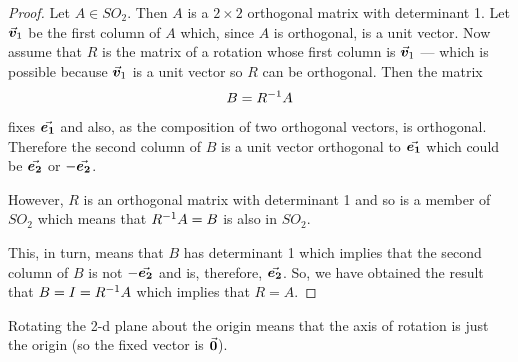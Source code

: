 \documentclass[MathsNotesBase.tex]{subfiles}
\begin{document}
{	\medskip
	
	\begin{proof}
		Let ${ A \in SO_2 }$. Then $A$ is a ${ 2 \times 2 }$ orthogonal matrix with determinant 1. Let $\vec{\bm{v}}_1$ be the first column of $A$ which, since $A$ is orthogonal, is a unit vector. Now assume that $R$ is the matrix of a rotation whose first column is $\vec{\bm{v}}_1$ --- which is possible because $\vec{\bm{v}}_1$ is a unit vector so $R$ can be orthogonal. Then the matrix
		\[ B = {R}^{-1}A \]
		fixes $\vec{\bm{e_1}}$ and also, as the composition of two orthogonal vectors, is orthogonal. Therefore the second column of $B$ is a unit vector orthogonal to $\vec{\bm{e_1}}$ which could be $\vec{\bm{e_2}}$ or $-\vec{\bm{e_2}}$. 
		
		However, $R$ is an orthogonal matrix with determinant 1 and so is a member of $SO_2$ which means that ${ {R}^{-1}A = B }$ is also in $SO_2$. 
		
		This, in turn, means that $B$ has determinant 1 which implies that the second column of $B$ is not $-\vec{\bm{e_2}}$ and is, therefore, $\vec{\bm{e_2}}$. So, we have obtained the result that ${ B = I = {R}^{-1}A }$ which implies that ${ R = A }$.
	\end{proof}

	\bigskip
	Rotating the 2-d plane about the origin means that the axis of rotation is just the origin (so the fixed vector is $\vec{\bm{0}}$).
	
}
\end{document}
